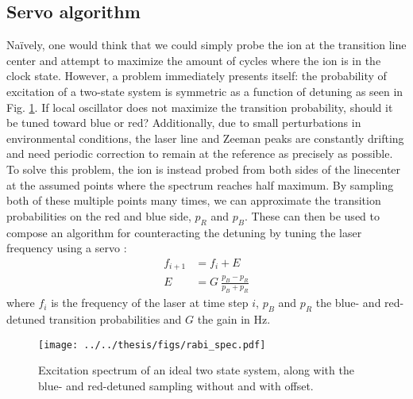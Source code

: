 \documentclass[a4paper,12pt]{article}
\begin{document}
\subsection{Servo algorithm}

Naïvely, one would think that we could simply probe the ion at the transition line
center and attempt to maximize the amount of cycles where the ion is in the clock state.
However, a problem immediately presents itself: the probability of excitation
of a two-state system is symmetric as a function of detuning as seen in Fig. \ref{fig:exc_spec}.
If local oscillator does not maximize the transition probability, should it be 
tuned toward blue or red?
Additionally, due to small perturbations in environmental conditions, the laser
line and Zeeman peaks are constantly drifting and need periodic correction to remain at the reference
as precisely as possible.
To solve this problem, the ion is instead probed from both sides of the linecenter
at the assumed points where the spectrum reaches half maximum.
By sampling both of these multiple points many times, we can approximate the 
transition probabilities on the red and blue side, $p_R$ and $p_B$.
These can then be used to compose an algorithm for counteracting the detuning
by tuning the laser frequency using a servo \cite{Dube2015a}:
\begin{align}
  f_{i+1} &= f_{i} + E \\
  E &= G\: \frac{p_B - p_R}{p_B + p_R}
\end{align}
where $f_i$ is the frequency of the laser at time step $i$, $p_B$ and $p_R$ the 
blue- and red-detuned transition probabilities and $G$ the gain in Hz.

\begin{figure}
  \texttt{[image: ../../thesis/figs/rabi\_spec.pdf]}
  \centering
  \caption{Excitation spectrum of an ideal two state system, along with
  the blue- and red-detuned sampling without and with offset.}
  \label{fig:exc_spec}
\end{figure}
\end{document}

